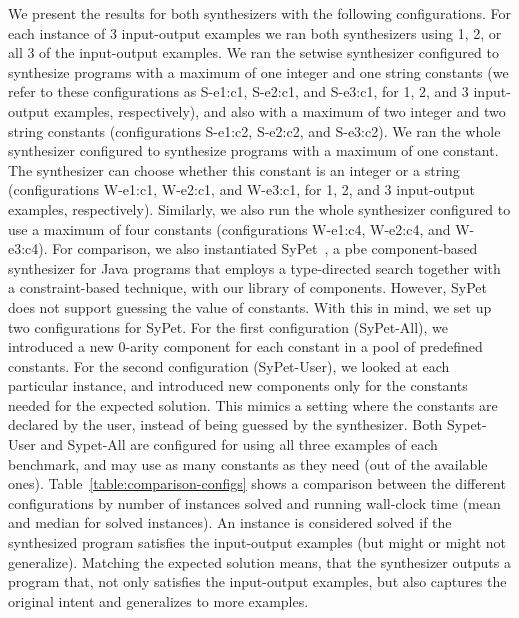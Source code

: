 We present the results for both synthesizers with the following configurations.
For each instance of 3 input-output examples we ran both synthesizers using 1,
2, or all 3 of the input-output examples.
We ran the setwise synthesizer configured to synthesize programs with a maximum
of one integer and one string constants (we refer to these configurations as
S-e1:c1, S-e2:c1, and S-e3:c1, for 1, 2, and 3 input-output examples,
respectively), and also with a maximum of two integer and two string constants
(configurations S-e1:c2, S-e2:c2, and S-e3:c2).
We ran the whole synthesizer configured to synthesize programs with a maximum of
one constant.
The synthesizer can choose whether this constant is an integer or a string
(configurations W-e1:c1, W-e2:c1, and W-e3:c1, for 1, 2, and 3 input-output
examples, respectively).
Similarly, we also run the whole synthesizer configured to use a maximum of four
constants (configurations W-e1:c4, W-e2:c4, and W-e3:c4).
For comparison, we also instantiated SyPet~\cite{Feng:2017:CSC}, a \gls{pbe}
component-based synthesizer for Java programs that employs a type-directed
search together with a constraint-based technique, with our library of
components.
However, SyPet does not support guessing the value of constants.
With this in mind, we set up two configurations for SyPet.
For the first configuration (SyPet-All), we introduced a new 0-arity component
for each constant in a pool of predefined constants.
For the second configuration (SyPet-User), we looked at each particular
instance, and introduced new components only for the constants needed for the
expected solution.
This mimics a setting where the constants are declared by the user, instead of
being guessed by the synthesizer.
Both Sypet-User and Sypet-All are configured for using all three examples of
each benchmark, and may use as many constants as they need (out of the available
ones).
Table~\ref{table:comparison-configs} shows a comparison between the different
configurations by number of instances solved and running wall-clock time (mean
and median for solved instances).
An instance is considered solved if the synthesized program satisfies the
input-output examples (but might or might not generalize).
Matching the expected solution means, that the synthesizer outputs a program
that, not only satisfies the input-output examples, but also captures the
original intent and generalizes to more examples.

